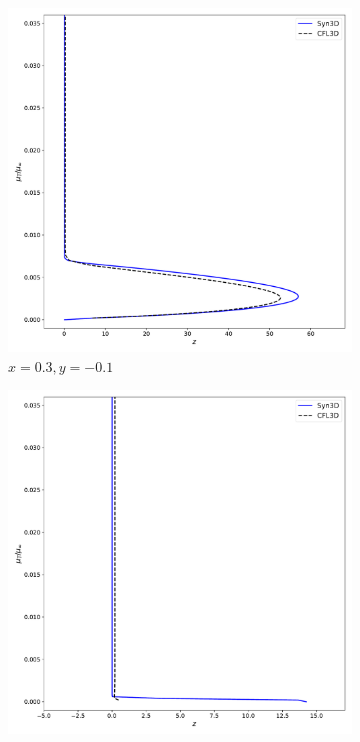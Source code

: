 \begin{figure}[ht!]
\centering
\begin{subfigure}{.45\textwidth}
  \centering
  \includegraphics[width=1.0\textwidth]{figs/3dbump/x03y01REV.pdf}
  \caption{$x=0.3, y=-0.1$}
\end{subfigure}%
\begin{subfigure}{.45\textwidth}
  \centering
  \includegraphics[width=1.0\textwidth]{figs/3dbump/x03y05REV.pdf}

\end{subfigure}
\end{figure}
